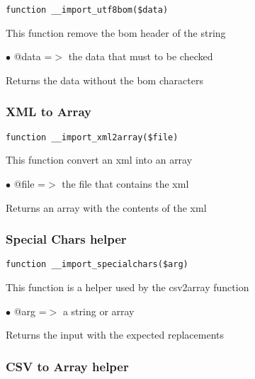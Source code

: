 \documentclass[a4paper]{article}
\begin{document}
\begin{lstlisting}
function __import_utf8bom($data)
\end{lstlisting}

This function remove the bom header of the string

\begin{compactitem}
\item[\color{myblue}$\bullet$] @data =$>$ the data that must to be checked
\end{compactitem}

Returns the data without the bom characters

\hypertarget{toc464}{}
\subsubsection{XML to Array}

\begin{lstlisting}
function __import_xml2array($file)
\end{lstlisting}

This function convert an xml into an array

\begin{compactitem}
\item[\color{myblue}$\bullet$] @file =$>$ the file that contains the xml
\end{compactitem}

Returns an array with the contents of the xml

\hypertarget{toc465}{}
\subsubsection{Special Chars helper}

\begin{lstlisting}
function __import_specialchars($arg)
\end{lstlisting}

This function is a helper used by the csv2array function

\begin{compactitem}
\item[\color{myblue}$\bullet$] @arg =$>$ a string or array
\end{compactitem}

Returns the input with the expected replacements

\hypertarget{toc466}{}
\subsubsection{CSV to Array helper}
\end{document}
